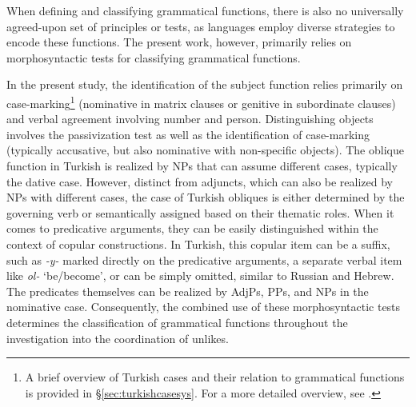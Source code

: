 When defining and classifying grammatical functions, there is also no universally agreed-upon set of principles or tests, as languages employ diverse strategies to encode these functions. The present work, however, primarily relies on morphosyntactic tests for classifying grammatical functions. 

In the present study, the identification of the subject function relies primarily on case-marking\footnote{A brief overview of Turkish cases and their relation to grammatical functions is provided in \S\ref{sec:turkishcasesys}. For a more detailed overview, see \citet[pp.\ 45--58]{asli_kerslake_2010}.} (nominative in matrix clauses or genitive in subordinate clauses) and verbal agreement involving number and person. Distinguishing objects involves the passivization test as well as the identification of case-marking (typically accusative, but also nominative with non-specific objects). The oblique function in Turkish is realized by NPs that can assume different cases, typically the dative case. However, distinct from adjuncts, which can also be realized by NPs with different cases, the case of Turkish obliques is either determined by the governing verb or semantically assigned based on their thematic roles. When it comes to predicative arguments, they can be easily distinguished within the context of copular constructions. In Turkish, this copular item can be a suffix, such as \textit{-y-} marked directly on the predicative arguments, a separate verbal item like \textit{ol-} `be/become', or can be simply omitted, similar to Russian and Hebrew. The predicates themselves can be realized by AdjPs, PPs, and NPs in the nominative case. Consequently, the combined use of these morphosyntactic tests determines the classification of grammatical functions throughout the investigation into the coordination of unlikes.


